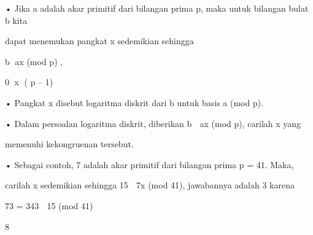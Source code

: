 \documentclass{article}
\begin{document}

• Jika a adalah akar primitif dari bilangan prima p, maka untuk bilangan bulat b kita 

dapat menemukan pangkat x sedemikian sehingga

b ax (mod p) ,

0 x ( p – 1)

• Pangkat x disebut logaritma diskrit dari b untuk basis a (mod p).

• Dalam persoalan logaritma diskrit, diberikan b  ax (mod p), carilah x yang 

memenuhi kekongruenan tersebut.  

• Sebagai contoh, 7 adalah akar primitif dari bilangan prima  p = 41. Maka,

   carilah x sedemikian sehingga  15  7x (mod 41), jawabannya adalah 3 karena 


73 = 343  15 (mod 41) 

8
\end{document}
